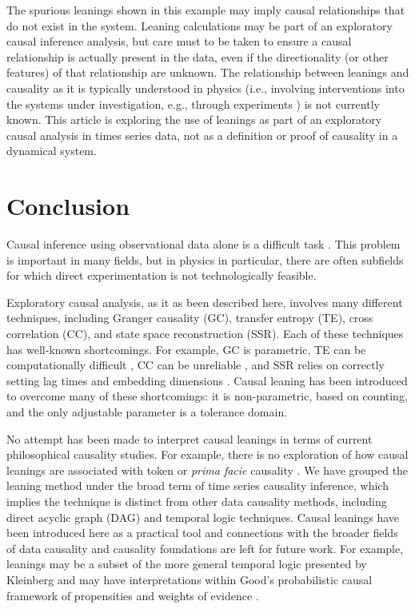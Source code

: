 \documentclass[twocolumn,aps,pre,groupedaddress]{revtex4-1}
\begin{document}
The spurious leanings shown in this example may imply causal relationships that do not exist in the system.  Leaning calculations may be part of an exploratory causal inference analysis, but care must to be taken to ensure a causal relationship is actually present in the data, even if the directionality (or other features) of that relationship are unknown.  The relationship between leanings and causality as it is typically understood in physics (i.e., involving interventions into the systems under investigation, e.g., through experiments \cite{Pearl2000}) is not currently known.  This article is exploring the use of leanings as part of an exploratory causal analysis in times series data, not as a definition or proof of causality in a dynamical system.   

\section{Conclusion}
Causal inference using observational data alone is a difficult task \cite{kleinberg2012}.  This problem is important in many fields, but in physics in particular, there are often subfields for which direct experimentation is not technologically feasible. 

Exploratory causal analysis, as it as been described here, involves many different techniques, including Granger causality (GC), transfer entropy (TE), cross correlation (CC), and state space reconstruction (SSR).  Each of these techniques has well-known shortcomings.  For example, GC is parametric, TE can be computationally difficult \cite{kaiser2002}, CC can be unreliable \cite{Rogosa1980}, and SSR relies on correctly setting lag times and embedding dimensions \cite{Small2004}.  Causal leaning has been introduced to overcome many of these shortcomings: it is non-parametric, based on counting, and the only adjustable parameter is a tolerance domain.  

No attempt has been made to interpret causal leanings in terms of current philosophical causality studies.   For example, there is no exploration of how causal leanings are associated with token or {\em prima facie} causality \cite{kleinberg2012}.  We have grouped the leaning method under the broad term of time series causality inference, which implies the technique is distinct from other data causality methods, including direct acyclic graph (DAG) \cite{Pearl2000} and temporal logic \cite{kleinberg2012} techniques.  Causal leanings have been introduced here as a practical tool and connections with the broader fields of data causality and causality foundations are left for future work.  For example, leanings may be a subset of the more general temporal logic presented by Kleinberg \cite{kleinberg2012} and may have interpretations within Good's probabilistic causal framework of propensities and weights of evidence \cite{Good1984}.
\end{document}
